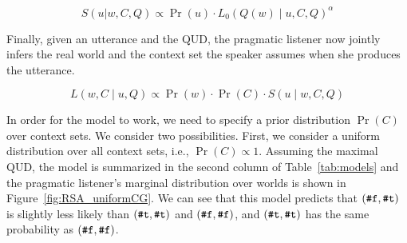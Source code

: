 \begin{equation}
S(u | w, C, Q) \propto \Pr(u) \cdot L_0(Q(w) \mid u, C, Q)^\alpha \label{eq:speaker-CG}
\end{equation}
 
Finally, given an utterance and the QUD, the pragmatic listener now jointly infers 
 the real world and the context set the speaker assumes when she produces the utterance. 

\begin{equation}
L(w, C \mid u, Q) \propto \Pr(w) \cdot \Pr(C) \cdot S(u \mid w, C, Q)
\end{equation}

In order for the model to work, we need to specify a prior distribution $\Pr(C)$ 
 over context sets.
We consider two possibilities. 
First, we consider a uniform distribution over all context sets, i.e., 
 $\Pr(C)\propto 1$.
Assuming the maximal QUD, the model is summarized in the second column of 
 Table~\ref{tab:models} and the pragmatic listener's marginal distribution over 
 worlds is shown in Figure~\ref{fig:RSA_uniformCG}.
We can see that this model predicts that $(\verb+#f+, \verb+#t+)$ is slightly 
 less likely than $(\verb+#t+, \verb+#t+)$ and $(\verb+#f+, \verb+#f+)$, 
 and $(\verb+#t+, \verb+#t+)$ has the same probability as $(\verb+#f+, \verb+#f+)$.


